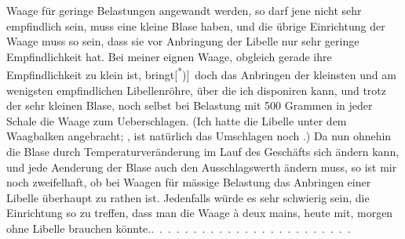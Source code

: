 Waage für geringe Belastungen angewandt werden, so darf jene nicht sehr
empfindlich sein, muss eine kleine Blase haben, und die übrige Einrichtung
der Waage muss so sein, dass sie vor Anbringung der Libelle nur sehr geringe
Empfindlichkeit hat. Bei meiner eignen Waage, obgleich gerade ihre
Empfindlichkeit zu klein ist, bringt[\textsuperscript{*})]\begingroup\renewcommand{\thefootnote}{}\endgroup\ doch das Anbringen der kleinsten und
\clearpage{}
\noindent am wenigsten empfindlichen Libellenröhre, über die ich disponiren kann, und
trotz der sehr kleinen Blase, noch selbst bei Belastung mit 500 Grammen in
jeder Schale die Waage zum Ueberschlagen. (Ich hatte die Libelle unter
dem Waagbalken angebracht; , ist natürlich das Umschlagen noch
.) Da nun ohnehin die Blase durch Temperaturveränderung im Lauf
des Geschäfts sich ändern kann, und jede Aenderung der Blase auch den
Ausschlagswerth ändern muss, so ist mir noch zweifelhaft, ob bei Waagen
für mässige Belastung das Anbringen einer Libelle überhaupt zu rathen ist.
Jedenfalls würde es sehr schwierig sein, die Einrichtung so zu treffen, dass
man die Waage à deux mains, heute mit, morgen ohne Libelle brauchen
könnte.\quad .\ .\ .\ .\ .\ .\ .\ .\ .\ .\ .\ .\ .\ .\ .\ .\ .\ .\ .\ .\ .\ .\ .\ .
\clearpage\endgroup
